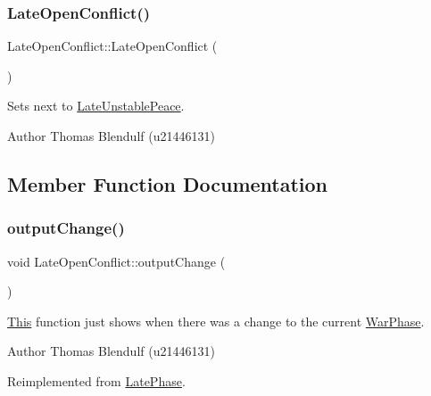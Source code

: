 \subsubsection{\texorpdfstring{LateOpenConflict()}{LateOpenConflict()}}
{\footnotesize\ttfamily Late\+Open\+Conflict\+::\+Late\+Open\+Conflict (\begin{DoxyParamCaption}{ }\end{DoxyParamCaption})}



Sets next to \mbox{\hyperlink{class_late_unstable_peace}{Late\+Unstable\+Peace}}. 

\begin{DoxyAuthor}{Author}
Thomas Blendulf (u21446131) 
\end{DoxyAuthor}


\subsection{Member Function Documentation}
\mbox{\label{class_late_open_conflict_a12323179f9dda8bc9bd278bef208b698}} 
\subsubsection{\texorpdfstring{outputChange()}{outputChange()}}
{\footnotesize\ttfamily void Late\+Open\+Conflict\+::output\+Change (\begin{DoxyParamCaption}{ }\end{DoxyParamCaption})\hspace{0.3cm}{\ttfamily [virtual]}}



\mbox{\hyperlink{class_this}{This}} function just shows when there was a change to the current \mbox{\hyperlink{class_war_phase}{War\+Phase}}. 

\begin{DoxyAuthor}{Author}
Thomas Blendulf (u21446131) 
\end{DoxyAuthor}


Reimplemented from \mbox{\hyperlink{class_late_phase_a5df8ed1819ba8a826b923f7f3c349245}{Late\+Phase}}.


